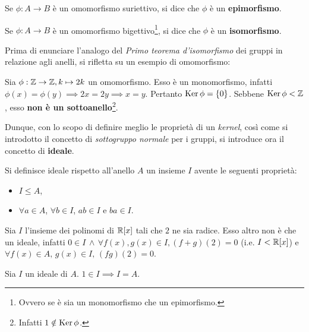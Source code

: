 \documentclass[11pt]{scrbook}
\begin{document}
\begin{definition}
    Se $\phi : A \to B$ è un omomorfismo suriettivo, si dice che
    $\phi$ è un \textbf{epimorfismo}.
\end{definition}

\begin{definition}
    Se $\phi : A \to B$ è un omomorfismo bigettivo\footnote{Ovvero se è sia un monomorfismo che un epimorfismo.}, si dice che
    $\phi$ è un \textbf{isomorfismo}.
\end{definition}

Prima di enunciare l'analogo del \textit{Primo teorema d'isomorfismo} dei gruppi
in relazione agli anelli, si rifletta su un esempio di omomorfismo:

\begin{example}
    Sia $\phi : \mathbb Z \to \mathbb Z, k \mapsto 2k$ un omomorfismo. Esso è un monomorfismo,
    infatti $\phi(x)=\phi(y) \implies 2x=2y \implies x=y$. Pertanto $\operatorname{Ker} \phi = \{0\}$. Sebbene $\operatorname{Ker} \phi < \mathbb Z$, esso \textbf{non è un sottoanello}\footnote{Infatti $1 \notin \operatorname{Ker} \phi$.}.
\end{example}

Dunque, con lo scopo di definire meglio le proprietà di un \textit{kernel},
così come si introdotto il concetto di \textit{sottogruppo normale} per i gruppi, si introduce ora il concetto di \textbf{ideale}.

\begin{definition}
    Si definisce ideale rispetto all'anello $A$ un insieme $I$ avente le seguenti proprietà:

    \begin{itemize}
        \item $I \leq A$,
        \item $\forall a \in A$, $\forall b \in I$, $ab \in I$ e $ba \in I$.
    \end{itemize}
\end{definition}

\begin{example}
    \label{exmpl:polinomi}
    Sia $I$ l'insieme dei polinomi di $\mathbb R[x]$ tali che $2$ ne sia radice. Esso
    altro non è che un ideale, infatti $0 \in I \,\land\, \forall f(x), g(x) \in I, (f+g)(2)=0$ (i.e. $I<\mathbb R[x]$) e $\forall f(x) \in A, \, g(x) \in I, \, (fg)(2) = 0$.
\end{example}

\begin{proposition}
    Sia $I$ un ideale di $A$. $1 \in I \implies I = A$.
\end{proposition}
\end{document}
